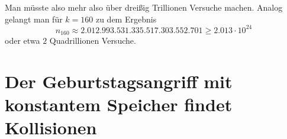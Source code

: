 \documentclass{../crypto}
\begin{document}
Man müsste also mehr also über dreißig Trillionen
Versuche machen. Analog gelangt man für $k=160$ zu dem Ergebnis 
\begin{equation*}
   n_{160} \approx 2.012.993.531.335.517.303.552.701 \ge 2.013 \cdot 10^{24}
\end{equation*}
oder etwa $2$ Quadrillionen Versuche.

\section{Der Geburtstagsangriff mit konstantem Speicher findet Kollisionen}
\end{document}

